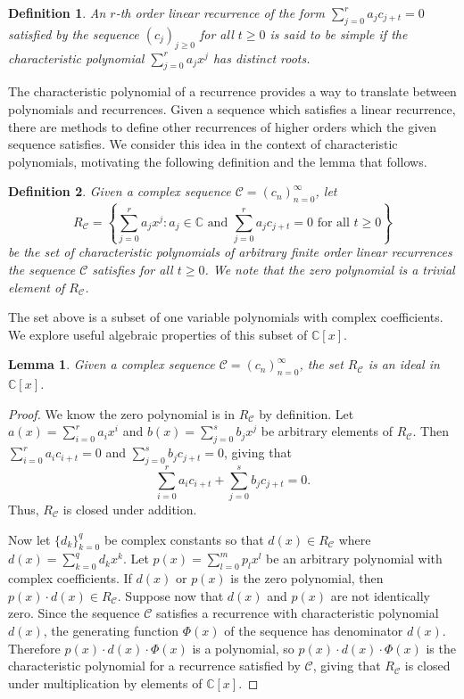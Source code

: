 \documentclass[12pt,reqno]{article}
\newtheorem{lemma}{Lemma}
\newtheorem{definition}{Definition}
\begin{document}
\begin{definition}
An $r$-th order linear recurrence of the form $\sum_{j=0}^r a_j c_{j+t} = 0$ satisfied by the sequence $(c_j)_{j \geq 0}$ for all $t\geq 0$ is said to be {\em simple} if the characteristic polynomial $\sum_{j=0}^r a_j x^j$ has distinct roots. 
\end{definition}

The characteristic polynomial of a recurrence provides a way to translate between polynomials and recurrences. Given a sequence which satisfies a linear recurrence, there are methods to define other recurrences of higher orders which the given sequence satisfies. We consider this idea in the context of characteristic polynomials, motivating the following definition and the lemma that follows. 

\begin{definition}
Given a complex sequence $\mathcal{C} = (c_n)_{n=0}^\infty$, let 
$$ 
R_{\mathcal{C}}= \left \{\sum_{j=0}^r a_j x^j : a_j\in\mathbb{C}\mbox{ and }\sum_{j=0}^r a_j c_{j+t} = 0 \mbox{ for all }t\geq 0 \right \}
$$
be the set of characteristic polynomials of arbitrary finite order linear recurrences the sequence $\mathcal{C}$ satisfies for all $t\geq 0$. We note that the zero polynomial is a trivial element of $R_{\mathcal{C}}$. 
\end{definition}

The set above is a subset of one variable polynomials with complex coefficients. We explore useful algebraic properties of this subset of $\mathbb{C}[x]$. 

\begin{lemma}
Given a complex sequence $\mathcal{C} = (c_n)_{n=0}^\infty$, the set $R_{\mathcal{C}}$ is an ideal in $\mathbb{C}[x]$. 
\end{lemma}
\begin{proof}
We know the zero polynomial is in $R_{\mathcal{C}}$ by definition. Let $a(x) = \sum_{i=0}^r a_i x^i$ and $b(x) = \sum_{j=0}^s b_j x^j$ be arbitrary elements of $R_{\mathcal{C}}$. Then $\sum_{i=0}^r a_i c_{i+t} = 0$ and $\sum_{j=0}^s b_j c_{j+t} = 0$, giving that 
$$
\sum_{i=0}^r a_i c_{i+t} + \sum_{j=0}^s b_j c_{j+t} = 0. 
$$
Thus, $R_{\mathcal{C}}$ is closed under addition.

Now let $\{d_k\}_{k=0}^q$ be complex constants so that $d(x)\in R_{\mathcal{C}}$ where $d(x) = \sum_{k=0}^q d_k x^k$. Let $p(x) = \sum_{l=0}^m p_l x^l$ be an arbitrary polynomial with complex coefficients. If $d(x)$ or $p(x)$ is the zero polynomial, then $p(x)\cdot d(x) \in R_{\mathcal{C}}$. Suppose now that $d(x)$ and $p(x)$ are not identically zero. Since the sequence $\mathcal{C}$ satisfies a recurrence with characteristic polynomial $d(x)$, the generating function $\Phi(x)$ of the sequence has denominator $d(x)$. Therefore $p(x)\cdot d(x)\cdot \Phi(x)$ is a polynomial, so $p(x)\cdot d(x)\cdot \Phi(x)$ is the characteristic polynomial for a recurrence satisfied by $\mathcal{C}$, giving that $R_{\mathcal{C}}$ is closed under multiplication by elements of $\mathbb{C}[x]$.
\end{proof}
\end{document}
